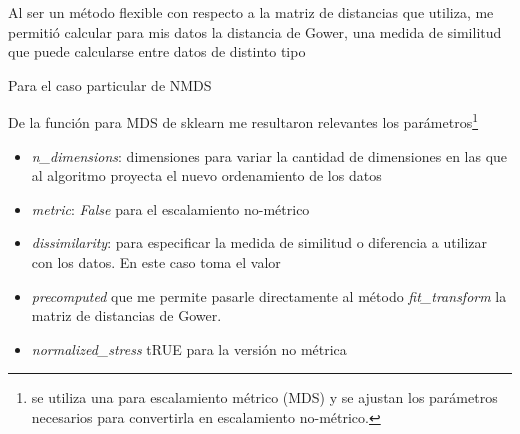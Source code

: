 \documentclass[10 pt]{article}
\begin{document}
Al ser un método flexible con respecto a la matriz de distancias que utiliza, me permitió calcular para mis datos la distancia de Gower, una medida de similitud que puede calcularse entre datos de distinto tipo



 Para el caso particular de NMDS


    










 De la función para MDS de sklearn me resultaron relevantes los parámetros\footnote{se utiliza una para escalamiento métrico (MDS) y se ajustan los parámetros necesarios para convertirla en escalamiento no-métrico. } 
 
 \begin{itemize}
    \item \textit{n\_dimensions}: dimensiones para variar la cantidad de dimensiones en las que al algoritmo proyecta el nuevo ordenamiento de los datos
    \item \textit{metric}: \textit{False} para el escalamiento no-métrico 
    \item \textit{dissimilarity}: para especificar la medida de similitud o diferencia a utilizar con los datos. En este caso toma el valor \item \textit{precomputed} que me permite pasarle directamente al método \textit{fit\_transform} la matriz de distancias de Gower.
    \item \textit{normalized\_stress} tRUE para la versión no métrica
 \end{itemize}
\end{document}
